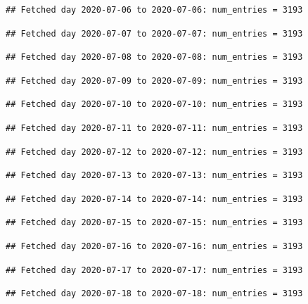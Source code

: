 \documentclass[]{article}
\begin{document}
\begin{verbatim}
## Fetched day 2020-07-06 to 2020-07-06: num_entries = 3193
\end{verbatim}

\begin{verbatim}
## Fetched day 2020-07-07 to 2020-07-07: num_entries = 3193
\end{verbatim}

\begin{verbatim}
## Fetched day 2020-07-08 to 2020-07-08: num_entries = 3193
\end{verbatim}

\begin{verbatim}
## Fetched day 2020-07-09 to 2020-07-09: num_entries = 3193
\end{verbatim}

\begin{verbatim}
## Fetched day 2020-07-10 to 2020-07-10: num_entries = 3193
\end{verbatim}

\begin{verbatim}
## Fetched day 2020-07-11 to 2020-07-11: num_entries = 3193
\end{verbatim}

\begin{verbatim}
## Fetched day 2020-07-12 to 2020-07-12: num_entries = 3193
\end{verbatim}

\begin{verbatim}
## Fetched day 2020-07-13 to 2020-07-13: num_entries = 3193
\end{verbatim}

\begin{verbatim}
## Fetched day 2020-07-14 to 2020-07-14: num_entries = 3193
\end{verbatim}

\begin{verbatim}
## Fetched day 2020-07-15 to 2020-07-15: num_entries = 3193
\end{verbatim}

\begin{verbatim}
## Fetched day 2020-07-16 to 2020-07-16: num_entries = 3193
\end{verbatim}

\begin{verbatim}
## Fetched day 2020-07-17 to 2020-07-17: num_entries = 3193
\end{verbatim}

\begin{verbatim}
## Fetched day 2020-07-18 to 2020-07-18: num_entries = 3193
\end{verbatim}
\end{document}
